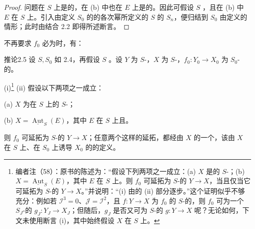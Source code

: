 \begin{proof}
问题在 $S$ 上是的，在 (b) 中也在 $E$ 上是的。因此可假设 $S$ ，且在 (b) 中 $E$ 在 $S$ 上。引入由定义 $S_0$ 的的各次幂所定义的 $S$ 的 $S_n$，便归结到 $S_0$ 由定义的情形；此时由结合 2.2 即得所述断言。
\end{proof}
不再要求 $f_0$ 必为时，有：
\begin{SGAresult}{推论}{2.5}
设 $S,S_0$ 如 2.4，再假设 $S$ 。设 $Y$ 为 $S$-，$X$ 为 $S$-，$f_0:Y_0\to X_0$ 为 $S_0$-的。

(i)\footnote{编者注（58）：原书的陈述为：“假设下列两项之一成立：(a) $X$ 是的 $S$-；(b) $X=\underline{\operatorname{Aut}}_S(E)$，其中 $E$ 在 $S$ 上。则 $f_0$ 可延拓为 $S$-的 $Y\to X$，当且仅当它可延拓为 $S$-的 $Y\to X$。”并说明：“(i) 由的 (ii) 部分逐步。”这个证明似乎不够充分：例如若 $\mathcal I^3=0$、$\mathcal J=\mathcal I^2$，且 $f:Y\to X$ 为 $f_0$ 的 $S$-的，则 $f_0$ 可为一个 $S_J$-的 $g_J:Y_J\to X_J$；但随后，$g_J$ 是否又可为 $S$-的 $g:Y\to X$ 呢？无论如何，下文未使用断言 (i)，其中始终假设 $X$ 在 $S$ 上。}
(ii) 假设以下两项之一成立：

(a) $X$ 为在 $S$ 上的 $S$-；

(b) $X=\underline{\operatorname{Aut}}_S(E)$，其中 $E$ 在 $S$ 上且。

则 $f_0$ 可延拓为 $S$-的 $Y\to X$；任意两个这样的延拓，都经由 $X$ 的一个，该由 $X$ 在 $S$ 上、在 $S_0$ 上诱导 $X_0$ 的的定义。
\end{SGAresult}
